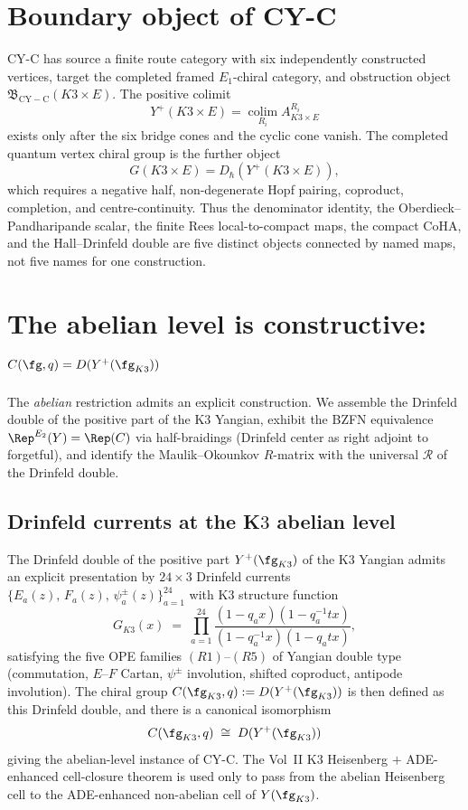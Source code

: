 \section{Boundary object of CY-C}
\label{sec:cy-c-concluding}

CY-C has source a finite route category with six independently
constructed vertices, target the completed framed \(E_1\)-chiral
category, and obstruction object
\(\mathfrak B_{\mathrm{CY-C}}(K3\times E)\). The positive colimit
\[
 Y^+(K3\times E)=
 \operatorname*{colim}_{R_i}A^{R_i}_{K3\times E}
\]
exists only after the six bridge cones and the cyclic cone vanish. The
completed quantum vertex chiral group is the further object
\[
 G(K3\times E)=D_\hbar(Y^+(K3\times E)),
\]
which requires a negative half, non-degenerate Hopf pairing, coproduct,
completion, and centre-continuity. Thus the denominator identity, the
Oberdieck--Pandharipande scalar, the finite Rees local-to-compact maps,
the compact CoHA, and the Hall--Drinfeld double are five distinct
objects connected by named maps, not five names for one construction.

\section{The abelian level is constructive: \texorpdfstring{$C(\fg, q) = D(Y^+(\fg_{K3}))$}{C(g, q) = D(Y-+(g-K3))}}
\label{sec:cy-c-abelian-constructive}

The \emph{abelian} restriction admits an explicit construction. We assemble the Drinfeld double of the positive part of the K$3$ Yangian, exhibit the BZFN equivalence $\Rep^{E_2}(Y) = \Rep(C)$ via half-braidings (Drinfeld center as right adjoint to forgetful), and identify the Maulik--Okounkov $R$-matrix with the universal $\mathcal{R}$ of the Drinfeld double.

\subsection{Drinfeld currents at the K\texorpdfstring{$3$}{3} abelian level}
\label{subsec:k3-abelian-drinfeld-currents}

\begin{theorem}
\label{thm:cy-c-abelian-K3}
The Drinfeld double of the positive part $Y^+(\fg_{K3})$ of the K$3$
Yangian admits an explicit presentation by $24 \times 3$ Drinfeld
currents $\{E_a(z),\, F_a(z),\, \psi^\pm_a(z)\}_{a=1}^{24}$ with K$3$
structure function
\[
 G_{K3}(x) \;=\; \prod_{a=1}^{24}
 \frac{(1 - q_a x)(1 - q_a^{-1} t x)}
 {(1 - q_a^{-1} x)(1 - q_a t x)},
\]
satisfying the five OPE families $(R1)$--$(R5)$ of Yangian double type
\textup{(}commutation, $E$--$F$ Cartan, $\psi^\pm$ involution, shifted
coproduct, antipode involution\textup{).} The chiral group
$C(\fg_{K3}, q) := D(Y^+(\fg_{K3}))$ is then defined as this Drinfeld
double, and there is a canonical isomorphism
\[
 C(\fg_{K3}, q) \;\cong\; D(Y^+(\fg_{K3}))
\]
giving the abelian-level instance of CY-C. The Vol~II K$3$ Heisenberg
$+$ ADE-enhanced cell-closure theorem is used only
to pass from the abelian Heisenberg cell to the ADE-enhanced
non-abelian cell of $Y(\fg_{K3})$.
\end{theorem}


